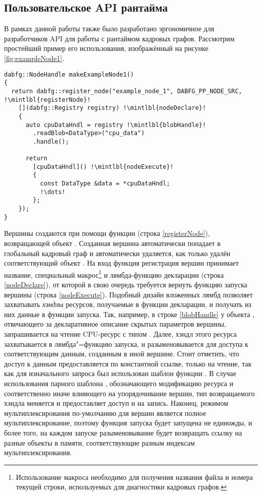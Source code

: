 \subsection{Пользовательское API рантайма}
В рамках данной работы также было разработано эргономичное для разработчиков API для работы с рантаймом кадровых графов. Рассмотрим простейший пример его использования, изображённый на рисунке \ref{fig:exampleNode1}.
\begin{figure*}
\begin{verbatim}
dabfg::NodeHandle makeExampleNode1()
{
  return dabfg::register_node("example_node_1", DABFG_PP_NODE_SRC, !\mintlbl{registerNode}!
    [](dabfg::Registry registry) !\mintlbl{nodeDeclare}!
    {
      auto cpuDataHndl = registry !\mintlbl{blobHandle}!
        .readBlob<DataType>("cpu_data")
        .handle();

      return
        [cpuDataHndl]() !\mintlbl{nodeExecute}!
        {
          const DataType &data = *cpuDataHndl;
          !\dots!
        };
    });
}
\end{verbatim}
\caption{Листинг элементарного примера использования разработанного API.}
\label{fig:exampleNode1}
\end{figure*}
Вершины создаются при помощи функции  (строка \ref{registerNode}), возвращающей объект .
Созданная вершина автоматически попадает в глобальный кадровый граф и автоматически удаляется, как только удалён соответствующий объект .
На вход функция регистрация вершин принимает название, специальный макрос\footnote{Использование макроса необходимо для получения названия файла и номера текущей строки, используемых для диагностики кадровых графов.} и лямбда-функцию декларации (строка \ref{nodeDeclare}), от которой в свою очередь требуется вернуть функцию запуска вершины (строка \ref{nodeExecute}).
Подобный дизайн вложенных лямбд позволяет захватывать \textit{хэндлы} ресурсов, получаемые в функции декларации, и получать из них данные в функции запуска.
Так, например, в строке \ref{blobHandle} у объекта , отвечающего за декларативное описание скрытых параметров вершины, запрашивается на чтение CPU-ресурс  с типом .
Далее, хэндл этого ресурса захватывается в лямбда"=функцию запуска, и разыменовывается для доступа к соответствующим данным, созданным в иной вершине.
Стоит отметить, что доступ к данным предоставляется по константной ссылке, только на чтение, так как для изначального запроса был использован шаблон функции .
В случае использования парного шаблона , обозначающего модификацию ресурса и соответственно иначе влияющего на упорядочивание вершин, тип возвращаемого хэндла меняется и предоставляет доступ и на запись.
Наконец, режимом мультиплексирования по-умолчанию для вершин является полное мультиплексирование, поэтому функция запуска будет запущена не единожды, и более того, на каждом запуске разыменовывание  будет возвращать ссылку на разные объекты в памяти, соответствующие разным индексам мультиплексирования.

